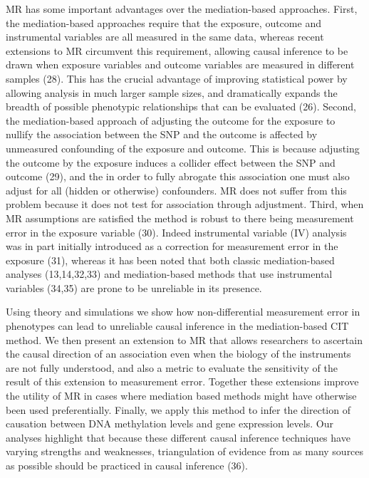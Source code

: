 \documentclass[]{article}
\begin{document}
MR has some important advantages over the mediation-based approaches.
First, the mediation-based approaches require that the exposure, outcome
and instrumental variables are all measured in the same data, whereas
recent extensions to MR circumvent this requirement, allowing causal
inference to be drawn when exposure variables and outcome variables are
measured in different samples (28). This has the crucial advantage of
improving statistical power by allowing analysis in much larger sample
sizes, and dramatically expands the breadth of possible phenotypic
relationships that can be evaluated (26). Second, the mediation-based
approach of adjusting the outcome for the exposure to nullify the
association between the SNP and the outcome is affected by unmeasured
confounding of the exposure and outcome. This is because adjusting the
outcome by the exposure induces a collider effect between the SNP and
outcome (29), and the in order to fully abrogate this association one
must also adjust for all (hidden or otherwise) confounders. MR does not
suffer from this problem because it does not test for association
through adjustment. Third, when MR assumptions are satisfied the method
is robust to there being measurement error in the exposure variable
(30). Indeed instrumental variable (IV) analysis was in part initially
introduced as a correction for measurement error in the exposure (31),
whereas it has been noted that both classic mediation-based analyses
(13,14,32,33) and mediation-based methods that use instrumental
variables (34,35) are prone to be unreliable in its presence.

Using theory and simulations we show how non-differential measurement
error in phenotypes can lead to unreliable causal inference in the
mediation-based CIT method. We then present an extension to MR that
allows researchers to ascertain the causal direction of an association
even when the biology of the instruments are not fully understood, and
also a metric to evaluate the sensitivity of the result of this
extension to measurement error. Together these extensions improve the
utility of MR in cases where mediation based methods might have
otherwise been used preferentially. Finally, we apply this method to
infer the direction of causation between DNA methylation levels and gene
expression levels. Our analyses highlight that because these different
causal inference techniques have varying strengths and weaknesses,
triangulation of evidence from as many sources as possible should be
practiced in causal inference (36).
\end{document}
